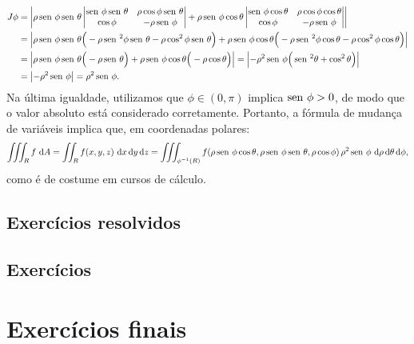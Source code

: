\begin{equation}
\begin{split}
J\phi & = \left| \rho \operatorname{sen}\, \phi \operatorname{sen}\, \theta
\left|
\begin{matrix}
\operatorname{sen}\, \phi \operatorname{sen}\, \theta     & \rho \cos \phi \operatorname{sen}\, \theta  \\
\cos \phi                 &    -\rho \operatorname{sen}\, \phi  \\
\end{matrix}
\right| + \rho \operatorname{sen}\, \phi \cos \theta
\left|
\begin{matrix}
\operatorname{sen}\, \phi \cos \theta      & \rho \cos \phi \cos \theta \\
\cos \phi                  &    -\rho \operatorname{sen}\, \phi  \\
\end{matrix}
\right| \right|  \\
& = \left| \rho \operatorname{sen}\, \phi \operatorname{sen}\, \theta \Big(- \rho \operatorname{sen}\,^2 \phi \operatorname{sen}\, \theta - \rho \cos^2 \phi \operatorname{sen}\, \theta \Big)  + \rho \operatorname{sen}\, \phi \cos \theta \Big(- \rho \operatorname{sen}\,^2 \phi \cos \theta - \rho \cos^2 \phi \cos \theta \Big) \right|  \\
& =  \left| \rho \operatorname{sen}\, \phi \operatorname{sen}\, \theta \Big (- \rho \operatorname{sen}\, \theta \Big) + \rho \operatorname{sen}\, \phi \cos \theta \Big(- \rho \cos \theta \Big) \right|  = \left|  - \rho^2 \operatorname{sen}\, \phi \Big( \operatorname{sen}\,^2 \theta + \cos^2 \theta \Big) \right| \\
& = \left| - \rho^2 \operatorname{sen}\, \phi \right| = \rho^2 \operatorname{sen}\, \phi.
\end{split}
\end{equation}
Na última igualdade, utilizamos que $\phi \in (0,\pi)$ implica $\operatorname{sen}\, \phi > 0$, de modo que o valor absoluto está considerado corretamente. Portanto, a fórmula de mudança de variáveis implica que, em coordenadas polares:
\begin{equation}
\iiint_R f \, \, \mathrm{d} A = \iint_R f(x,y, z) \, \, \mathrm{d} x \, \mathrm{d} y \, \mathrm{d} z = \iiint_{\phi^{-1}(R)} f(\rho \operatorname{sen}\, \phi \cos \theta, \rho \operatorname{sen}\, \phi \operatorname{sen}\, \theta, \rho \cos \phi) \, \rho^2 \operatorname{sen}\, \phi \, \, \mathrm{d} \rho \, \mathrm{d} \theta \, \mathrm{d} \phi,
\end{equation} como é de costume em cursos de cálculo.


\subsection*{Exercícios resolvidos}

\construirExeresol

\subsection*{Exercícios}

\construirExer

\section{Exercícios finais}

\construirExer

%
